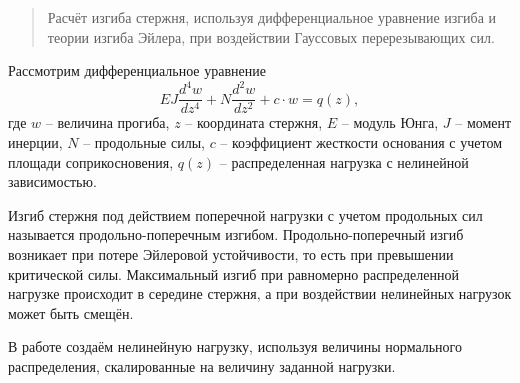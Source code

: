 \maketitle

\begin{abstract}
Расчёт изгиба стержня, используя дифференциальное уравнение изгиба и теории изгиба Эйлера, при воздействии Гауссовых перерезывающих сил.

\end{abstract}


Рассмотрим дифференциальное уравнение
$$
EJ\frac{d^4w}{dz^4}+N\frac{d^2w}{dz^2}+c\cdot w=q(z),
$$
где $w$ -- величина прогиба, $z$ -- координата стержня, $E$ -- модуль Юнга, $J$ -- момент инерции, $N$ -- продольные силы, $c$ -- коэффициент жесткости основания с учетом площади соприкосновения, $q(z)$ -- распределенная нагрузка с нелинейной зависимостью.


 Изгиб стержня под действием поперечной нагрузки с учетом продольных сил называется продольно-поперечным изгибом. Продольно-поперечный изгиб возникает при потере Эйлеровой устойчивости, то есть при превышении критической силы. Максимальный изгиб при равномерно распределенной нагрузке происходит в середине стержня, а при воздействии нелинейных нагрузок может быть смещён.

 В работе создаём нелинейную нагрузку, используя величины нормального распределения, скалированные на величину заданной нагрузки.


%


\iffalse
\begin{thebibliography}{9} %
\bibitem{Sv} Светлицкий~В.~А. Механика стержней. Ч.~1. Статика. М.:~Высшая школа, 1987.

\bibitem{Feod} Феодосьев~В.~И. Избранные задачи и вопросы по сопротивлению материалов.  М.:~Наука, 1996.


\bibitem{Birg} Биргер~И.А., Пановко~Я.Г. Прочность, устойчивость, колебания. Том~1. М.:~Машиностроение, 1968.

\bibitem{Darkov} Дарков~А.В., Шпиро~Г.С. Сопротивление материалов. М.:~Высшая школа, 1975.

\bibitem{Tim1}	Тимошенко~С.П., Гудьер~Дж. Теория упругости. М.:~Наука, 1979.

\bibitem{Tim2}	Тимошенко~С.П. Сопротивление материалов. Том~2. М.:~Наука, 1965.
\end{thebibliography}
\fi



%